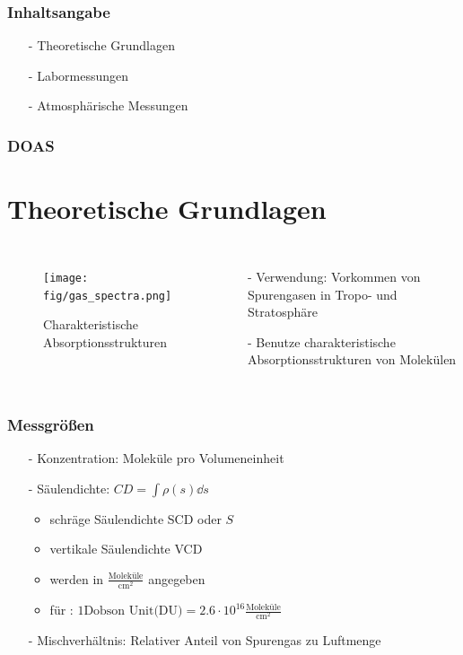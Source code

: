 \documentclass{beamer}
\begin{document}
\begin{frame}
    \frametitle{Inhaltsangabe}
    \begin{itemize}
        \item[-] Theoretische Grundlagen
    \vfill
		\item[-] Labormessungen
    \vfill
		\item[-] Atmosphärische Messungen 
	\end{itemize}
\end{frame}

\begin{frame}
    \frametitle{DOAS}
    \section{Theoretische Grundlagen}
    \begin{columns}

        \begin{figure}
        \texttt{[image: fig/gas\_spectra.png]}
        \caption{Charakteristische Absorptionsstrukturen \cite{atm_script}}
        \end{figure}
    
    	\begin{itemize}
        	\item[-] Verwendung: Vorkommen von Spurengasen in Tropo- und Stratosphäre
        	\item[-] Benutze charakteristische Absorptionsstrukturen von Molekülen
    	\end{itemize}
	\end{columns}
\end{frame}

\begin{frame}
\frametitle{Messgrößen}
\begin{itemize}
    \item[-] Konzentration: Moleküle pro Volumeneinheit
        \pause
    \item[-] Säulendichte: $CD = \int \rho (s) \dd s$
        \begin{itemize}
            \item schräge Säulendichte SCD oder $S$
            \item vertikale Säulendichte VCD
            \item werden in $\frac{\text{Moleküle}}{\text{cm}^2}$ angegeben
            \item für : $1 \text{Dobson Unit(DU)} = 2.6 \cdot 10^{16} \frac{\text{Moleküle}}{\text{cm}^2}$ 
        \end{itemize}
        \pause
    \item[-] Mischverhältnis: Relativer Anteil von Spurengas zu Luftmenge
    \end{itemize}
\end{frame}
\end{document}
